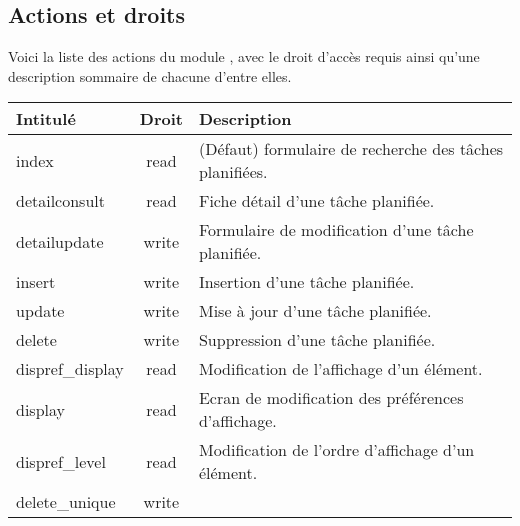 \subsection{Actions et droits}

Voici la liste des actions du module \todo, avec le droit d'accès requis ainsi qu'une description sommaire de chacune d'entre elles.\\

\begin{tabular}{|l|c|p{9.5cm}|}
 \hline
 \textbf{Intitulé} & \textbf{Droit} & \textbf{Description} \\
 \hline
  index & read & (Défaut) formulaire de recherche des tâches planifiées. \\ 
 \hline
  detailconsult & read & Fiche détail d'une tâche planifiée. \\
 \hline
  detailupdate & write & Formulaire de modification d'une tâche planifiée. \\
 \hline
  insert & write & Insertion d'une tâche planifiée. \\
 \hline
  update & write & Mise à jour d'une tâche planifiée. \\
 \hline
  delete & write & Suppression d'une tâche planifiée. \\
 \hline
  dispref\_display & read &  Modification de l'affichage d'un élément.\\
 \hline
  display & read & Ecran de modification des préférences d'affichage. \\
 \hline
  dispref\_level & read & Modification de l'ordre d'affichage d'un élément. \\
 \hline
  delete\_unique & write &  \\
 \hline
\end{tabular}
